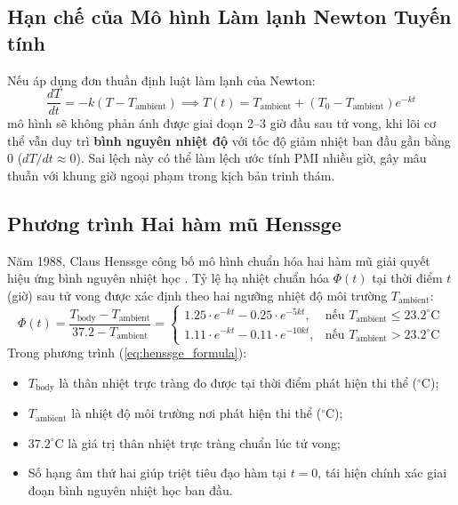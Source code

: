 \subsection{Hạn chế của Mô hình Làm lạnh Newton Tuyến tính}
Nếu áp dụng đơn thuần định luật làm lạnh của Newton:
\begin{equation}
    \frac{dT}{dt} = -k (T - T_{\text{ambient}}) \implies T(t) = T_{\text{ambient}} + (T_0 - T_{\text{ambient}}) e^{-kt}
\end{equation}
mô hình sẽ không phản ánh được giai đoạn 2--3 giờ đầu sau tử vong, khi lõi cơ thể vẫn duy trì \textbf{bình nguyên nhiệt độ} với tốc độ giảm nhiệt ban đầu gần bằng 0 ($dT/dt \approx 0$). Sai lệch này có thể làm lệch ước tính PMI nhiều giờ, gây mâu thuẫn với khung giờ ngoại phạm trong kịch bản trinh thám.

\subsection{Phương trình Hai hàm mũ Henssge}
Năm 1988, Claus Henssge công bố mô hình chuẩn hóa hai hàm mũ giải quyết hiệu ứng bình nguyên nhiệt học \cite{henssge1988death, henssge2000estimation}. Tỷ lệ hạ nhiệt chuẩn hóa $\Phi(t)$ tại thời điểm $t$ (giờ) sau tử vong được xác định theo hai ngưỡng nhiệt độ môi trường $T_{\text{ambient}}$:
\begin{equation}
    \Phi(t) = \frac{T_{\text{body}} - T_{\text{ambient}}}{37.2 - T_{\text{ambient}}} =
    \begin{cases}
        1.25 \cdot e^{-k t} - 0.25 \cdot e^{-5k t}, & \text{nếu } T_{\text{ambient}} \le 23.2^\circ\text{C} \\
        1.11 \cdot e^{-k t} - 0.11 \cdot e^{-10k t}, & \text{nếu } T_{\text{ambient}} > 23.2^\circ\text{C}
    \end{cases}
    \label{eq:henssge_formula}
\end{equation}
Trong phương trình (\ref{eq:henssge_formula}):
\begin{itemize}[leftmargin=1.5cm]
    \item $T_{\text{body}}$ là thân nhiệt trực tràng đo được tại thời điểm phát hiện thi thể ($^\circ\text{C}$);
    \item $T_{\text{ambient}}$ là nhiệt độ môi trường nơi phát hiện thi thể ($^\circ\text{C}$);
    \item $37.2^\circ\text{C}$ là giá trị thân nhiệt trực tràng chuẩn lúc tử vong;
    \item Số hạng âm thứ hai giúp triệt tiêu đạo hàm tại $t=0$, tái hiện chính xác giai đoạn bình nguyên nhiệt học ban đầu.
\end{itemize}

